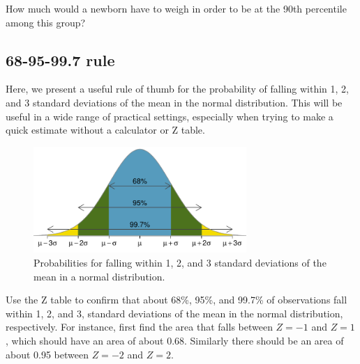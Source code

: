 \begin{exercisewrap}
\begin{nexercise}How much would a newborn have to weigh in order to be at the 90th percentile among this group?\footnotemark
\end{nexercise}
\end{exercisewrap}


\D{\newpage}

\subsection{68-95-99.7 rule}

Here, we present a useful rule of thumb for the probability of falling within 1, 2, and 3 standard deviations of the mean in the normal distribution. This will be useful in a wide range of practical settings, especially when trying to make a quick estimate without a calculator or Z table.

\begin{figure}[h]
\centering
\includegraphics[width=0.72\textwidth]{ch_distributions/figures/6895997/6895997}
\caption{Probabilities for falling within 1, 2, and 3 standard deviations of the mean in a normal distribution.}
\label{6895997}
\end{figure}

\begin{exercisewrap}
\begin{nexercise}
Use the Z table to confirm that about 68\%, 95\%, and 99.7\% of observations fall within 1, 2, and 3, standard deviations of the mean in the normal distribution, respectively. For instance, first find the area that falls between $Z=-1$ and $Z=1$, which should have an area of about 0.68. Similarly there should be an area of about 0.95 between $Z=-2$ and $Z=2$.\footnotemark\end{nexercise}
\end{exercisewrap}

